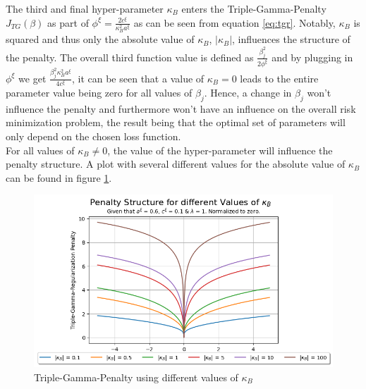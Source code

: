\documentclass[12pt,a4paper]{article}
\begin{document}
The third and final hyper-parameter $\kappa_B$ enters the Triple-Gamma-Penalty $J_{TG}(\beta)$ as part of $\phi^\xi = \frac{2c^\xi}{\kappa_B^2 a^\xi}$ as can be seen from equation \ref{eq:tgr}. Notably, $\kappa_B$ is squared and thus only the absolute value of $\kappa_B$, $|\kappa_B|$, influences the structure of the penalty. The overall third function value is defined as $\frac{\beta_j^2}{2\phi^\xi}$ and by plugging in $\phi^\xi$ we get $\frac{\beta_j^2\kappa_ B^2a^\xi}{4c^\xi}$, it can be seen that a value of $\kappa_B = 0$ leads to the entire parameter value being zero for all values of $\beta_j$. Hence, a change in $\beta_j$ won't influence the penalty and furthermore won't have an influence on the overall risk minimization problem, the result being that the optimal set of parameters will only depend on the chosen loss function.\\

For all values of $\kappa_B \neq 0$, the value of the hyper-parameter will influence the penalty structure. A plot with several different values for the absolute value of $\kappa_B$ can be found in figure \ref{fig:TGPenalty_ChangeInKappa}.

\begin{figure}[t]
\centering
\includegraphics[scale=0.75]{../02_simulation/021_simulation_figures/TGPenalty_ChangeInKappa.png}
\caption{Triple-Gamma-Penalty using different values of $\kappa_B$}
\label{fig:TGPenalty_ChangeInKappa}
\end{figure}
\end{document}
